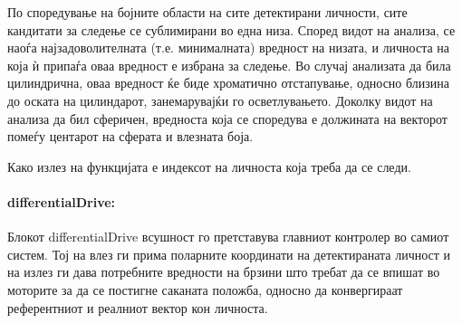 \documentclass[12pt]{article}
\begin{document}
        По споредување на бојните области на сите детектирани личности, сите кандитати за следење се сублимирани во една низа. Според видот на анализа, се наоѓа најзадоволителната (т.е. минималната) вредност на низата, и личноста на која ѝ припаѓа оваа вредност е избрана за следење. Во случај анализата да била цилиндрична, оваа вредност ќе биде хроматично отстапување, односно близина до оската на цилиндарот, занемарувајќи го осветлувањето. Доколку видот на анализа да бил сферичен, вредноста која се споредува е должината на векторот помеѓу центарот на сферата и влезната боја.

        Како излез на функцијата е индексот на личноста која треба да се следи.

      \paragraph{differentialDrive:\\}
        Блокот differentialDrive всушност го претставува главниот контролер во самиот систем. Тој на влез ги прима поларните координати на детектираната личност и на излез ги дава потребните вредности на брзини што требат да се впишат во моторите за да се постигне саканата положба, односно да конвергираат референтниот и реалниот вектор кон личноста. %
\end{document}
